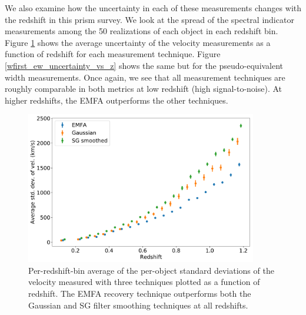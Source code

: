 We also examine how the uncertainty in each of these measurements changes with the redshift in this prism survey. We look at the spread of the spectral indicator measurements among the 50 realizations of each object in each redshift bin. Figure \ref{wfirst_vel_uncertainty_vs_z} shows the average uncertainty of the velocity measurements as a function of redshift for each measurement technique. Figure \ref{wfirst_ew_uncertainty_vs_z} shows the same but for the pseudo-equivalent width measurements. Once again, we see that all measurement techniques are roughly comparable in both metrics at low redshift (high signal-to-noise). At higher redshifts, the EMFA outperforms the other techniques.

\begin{figure}[htbp]
    \centering
    \includegraphics[width=0.9\textwidth]{figures/si_feat_pca/wfirst_vel_uncert.pdf}
    \caption{Per-redshift-bin average of the per-object standard deviations of the velocity measured with three techniques plotted as a function of redshift. The EMFA recovery technique outperforms both the Gaussian and SG filter smoothing techniques at all redshifts.}
    \label{wfirst_vel_uncertainty_vs_z}
\end{figure}

